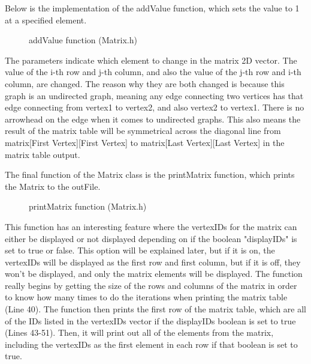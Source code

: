 \documentclass[letterpaper, 10pt]{article}
\begin{document}
\vspace{1em}
\noindent
Below is the implementation of the addValue function, which sets the value to 1 at a specified element.

\begin{figure}[H]
  \centering
   
  \caption{addValue function (Matrix.h)}
  \label{fig:figure2.6}
\end{figure}

\noindent
The parameters indicate which element to change in the matrix 2D vector. The value of the i-th row and j-th column, and also the value of the j-th row and i-th column, are changed. The reason why they are both changed is because this graph is an undirected graph, meaning any edge connecting two vertices has that edge connecting from vertex1 to vertex2, and also vertex2 to vertex1. There is no arrowhead on the edge when it comes to undirected graphs. This also means the result of the matrix table will be symmetrical across the diagonal line from matrix[First Vertex][First Vertex] to matrix[Last Vertex][Last Vertex] in the matrix table output.

\vspace{1em}

\noindent
The final function of the Matrix class is the printMatrix function, which prints the Matrix to the outFile.

\begin{figure}[H]
  \centering
   
  \label{fig:figure2.7-part1}
\end{figure}

\begin{figure}[H]
  \centering
   
  \caption{printMatrix function (Matrix.h)}
  \label{fig:figure2.7-part2}
\end{figure}

\noindent
This function has an interesting feature where the vertexIDs for the matrix can either be displayed or not displayed depending on if the boolean "displayIDs" is set to true or false. This option will be explained later, but if it is on, the vertexIDs will be displayed as the first row and first column, but if it is off, they won't be displayed, and only the matrix elements will be displayed. The function really begins by getting the size of the rows and columns of the matrix in order to know how many times to do the iterations when printing the matrix table (Line 40). The function then prints the first row of the matrix table, which are all of the IDs listed in the vertexIDs vector if the displayIDs boolean is set to true (Lines 43-51). Then, it will print out all of the elements from the matrix, including the vertexIDs as the first element in each row if that boolean is set to true.  
\end{document}
